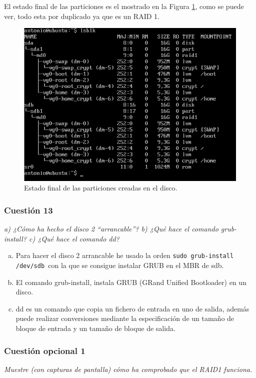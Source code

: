 El estado final de las particiones es el mostrado en la Figura \ref{fig3}, como se puede ver, todo esta por duplicado ya que es un RAID 1.
\begin{figure}[H]
    \begin{center}
        \includegraphics[scale=0.5]{Imagenes/particionado}
        \caption{Estado final de las particiones creadas en el disco.}
        \label{fig3}
    \end{center}
\end{figure}
\subsubsection{Cuestión 13}

\textit{a) ¿Cómo ha hecho el disco 2 “arrancable”? b) ¿Qué hace el comando grub-install? c) ¿Qué hace el comando dd?} \newline
\begin{enumerate}[a)]
    \item Para hacer el disco 2 arrancable he usado la orden \texttt{sudo grub-install /dev/sdb }con la que se consigue instalar GRUB en el MBR de sdb.
    \item El comando grub-install, instala GRUB (GRand Unified Bootloader) en un disco. \cite{grub}
    \item dd es un comando que copia un fichero de entrada en uno de salida, además puede realizar conversiones mediante la especificación de un tamaño de bloque de entrada y un tamaño de bloque de salida. \cite{dd}
\end{enumerate}

\subsubsection{Cuestión opcional 1}
\textit{Muestre (con capturas de pantalla) cómo ha comprobado que el RAID1 funciona.} \newline

